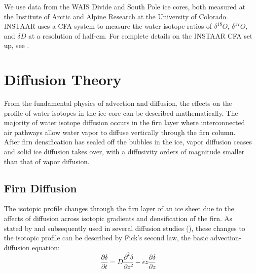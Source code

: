 \documentclass[draft, jgrga]{AGUTeX}
\begin{document}
\begin{article}
We use data from the WAIS Divide and South Pole ice cores, both measured at the Institute of Arctic and Alpine Research at the University of Colorado. INSTAAR uses a CFA system to measure the water isotope ratios of $\delta ^{18}O$, $\delta ^{17}O$, and $\delta D$ at a resolution of half-cm. For complete details on the INSTAAR CFA set up, see \citet{JonesCFA2016}.


\section{Diffusion Theory}

From the fundamental physics of advection and diffusion, the effects on the profile of water isotopes in the ice core can be described mathematically. The majority of water isotope diffusion occurs in the firn layer where interconnected air pathways allow water vapor to diffuse vertically through the firn column. After firn densification has sealed off the bubbles in the ice, vapor diffusion ceases and solid ice diffusion takes over, with a diffusivity orders of magnitude smaller than that of vapor diffusion.

\subsection{Firn Diffusion}

The isotopic profile changes through the firn layer of an ice sheet due to the affects of diffusion across isotopic gradients and densification of the firn. As stated by \citet{Johnsen1977} and subsequently used in several diffusion studies (\citep{Johnsen2000, Simonsen2011, Gkinis2014, VanderWel2015, Jones2016, Holme2017}), these changes to the isotopic profile can be described by Fick's second law, the basic advection-diffusion equation:
\begin{equation}
\frac{\partial \delta}{\partial t}
= D \frac{\partial ^2 \delta}{\partial z^2}
- \dot{\epsilon}
z \frac{\partial \delta}{\partial z}
\end{equation}


\end{article}
\end{document}
